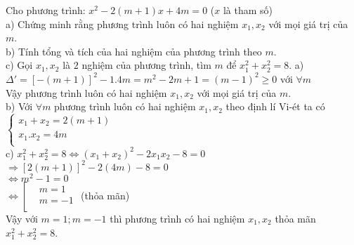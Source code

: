 \begin{ex}%
	Cho phương trình: $x^2-2\left( m+1 \right)x+4m=0$ 	($x$ là tham số)\\
	a) Chứng minh rằng phương trình luôn có hai nghiệm $x_1,x_2$ với mọi giá trị của $m$.\\
	b) Tính tổng và tích của hai nghiệm của phương trình theo $m$.\\
	c) Gọi  $x_1,x_2$ là $2$ nghiệm của phương trình, tìm $m$ để $x_1^2+x_2^2=8$.
	\loigiai
{
		a) ${\Delta }'={{\left[ -\left( m+1 \right) \right]}^{2}}-1.4m=m^2-2m+1={{\left( m-1 \right)}^{2}}\ge 0$  với $\forall m$ \\
		Vậy phương trình luôn có hai nghiệm $x_1,x_2$ với mọi giá trị của $m$.\\
		b) Với $\forall m$ phương trình luôn có hai nghiệm $x_1,x_2$ theo định lí Vi-ét ta có
		$\begin{cases} x_1+x_2=2\left( m+1 \right) \\ x_1.x_2=4m \\ 
		\end{cases}$ \\
		c) $x_1^2+x_2^2=8\Leftrightarrow {{\left( {{x}_{1}}+{{x}_{2}} \right)}^{2}}-2{{x}_{1}}{{x}_{2}}-8=0$\\
		$\Rightarrow {{\left[ 2 \left( m+1 \right) \right]}^{2}}-2\left( 4m \right)-8=0$\\
		$ \Leftrightarrow {{m}^{2}}-1=0$\\
		$\Leftrightarrow \left[ \begin{aligned} & m=1 \\  & m=-1 \\ \end{aligned} \right.$ (thỏa mãn)\\
		Vậy với $m=1;m=-1$ thì phương trình có hai nghiệm ${{x}_{1}},{{x}_{2}}$ thỏa mãn $x_{1}^{2}+x_{2}^{2}=8$.
}
\end{ex}
